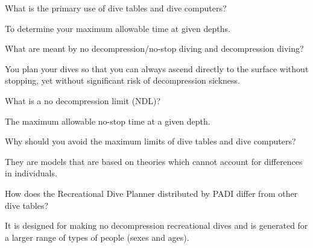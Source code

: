 	\begin{qanda}
		\begin{question}
What is the primary use of dive tables and dive computers?
		\end{question}

		\begin{answer}
To determine your maximum allowable time at given depths.
		\end{answer}
	\end{qanda}

	\begin{qanda}
		\begin{question}
What are meant by no decompression/no-stop diving and decompression diving?
		\end{question}

		\begin{answer}
You plan your dives so that you can always ascend directly to the surface without stopping, yet without significant risk of decompression sickness.
		\end{answer}
	\end{qanda}

	\begin{qanda}
		\begin{question}
What is a no decompression limit (NDL)?
		\end{question}

		\begin{answer}
The maximum allowable no-stop time at a given depth.
		\end{answer}
	\end{qanda}

	\begin{qanda}
		\begin{question}
Why should you avoid the maximum limits of dive tables and dive computers?
		\end{question}

		\begin{answer}
They are models that are based on theories which cannot account for differences in individuals.
		\end{answer}
	\end{qanda}

	\begin{qanda}
		\begin{question}
How does the Recreational Dive Planner distributed by PADI differ from other dive tables?%
		\end{question}

		\begin{answer}
It is designed for making no decompression recreational dives and is generated for a larger range of types of people (sexes and ages).
		\end{answer}
	\end{qanda}

